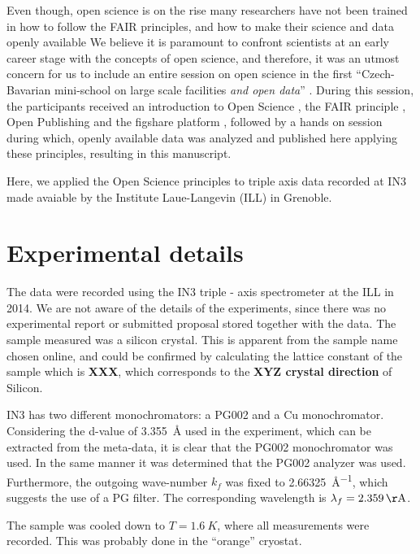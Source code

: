 \documentclass[aps,prx,reprint,amsmath,amssymb,superscriptaddress,showpacs]{revtex4-1}
\begin{document}
Even though, open science is on the rise many researchers have not been trained in how to follow the FAIR principles, and how to make their science and data openly available
We believe it is paramount to confront scientists at an early career stage with the concepts of open science, and therefore, it was an utmost concern for us to include an entire session on open science in the first ``Czech-Bavarian mini-school on large scale facilities \emph{and open data}'' \cite{mini-school}.
During this session, the participants received an introduction to Open Science \cite{foster}, the FAIR principle \cite{FAIR}, Open Publishing \cite{arXiv} and the figshare platform \cite{figshare}, followed by a hands on session during which, openly available data was analyzed and published here applying these principles, resulting in this manuscript.
 
Here, we applied the Open Science principles to triple axis data recorded at IN3 \cite{data} made avaiable by the Institute Laue-Langevin (ILL) in Grenoble.

\section{Experimental details}

The data were recorded using the IN3 triple - axis spectrometer \cite{IN3} at the ILL in 2014.
We are not aware of the details of the experiments, since there was no experimental report or submitted proposal stored together with the data.
The sample measured was a silicon crystal. 
This is apparent from the sample name chosen online, and could be confirmed by calculating the lattice constant of the sample which is \textbf{XXX}, which corresponds to the \textbf{XYZ crystal direction} of Silicon.

IN3 has two different monochromators: a PG002 and a Cu monochromator.
Considering the d-value of \SI{3.355}{\AA} used in the experiment, which can be extracted from the meta-data, it is clear that the PG002 monochromator was used.
In the same manner it was determined that the PG002 analyzer was used. 
Furthermore, the outgoing wave-number $k_f$ was fixed to \SI{2.66325}{\AA^{-1}}, which suggests the use of a PG filter. 
The corresponding wavelength is $\lambda_f=\SI{2.359}{\AA}$.

The sample was cooled down to $T = \SI{1.6}{K}$, where all measurements were recorded. 
This was probably done in the ``orange'' cryostat.
\end{document}

